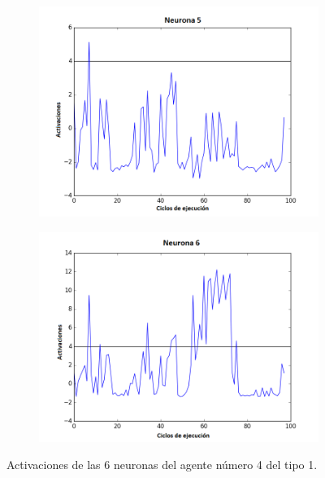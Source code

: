 \begin{figure}[!h]
\begin{subfigure}{0.33\textwidth}
  \includegraphics[width=\linewidth]{Imagenes/Agente1Activaciones/Agente3/Neurona4}
\end{subfigure}\hfil %
\begin{subfigure}{0.33\textwidth}
  \includegraphics[width=\linewidth]{Imagenes/Agente1Activaciones/Agente3/Neurona5}
\end{subfigure}
\caption{Activaciones de las 6 neuronas del agente número 4 del tipo 1.}
\end{figure}

